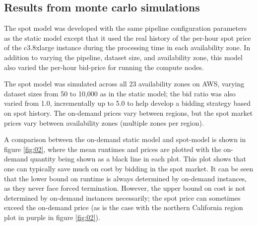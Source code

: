\documentclass{frontiersSCNS} %
\begin{document}
\subsection{Results from monte carlo simulations}

The spot model was developed with the same pipeline configuration parameters as the static model except that it used the real history of the per-hour spot price of the c3.8xlarge instance during the processing time in each availability zone. In addition to varying the pipeline, dataset size, and availability zone, this model also varied the per-hour bid-price for running the compute nodes.

The spot model was simulated across all 23 availability zones on AWS, varying dataset sizes from 50 to 10,000 as in the static model; the bid ratio was also varied from 1.0, incrementally up to 5.0 to help develop a bidding strategy based on spot history. The on-demand prices vary between regions, but the spot market prices vary between availability zones (multiple zones per region).

A comparison between the on-demand static model and spot-model is shown in figure \ref{fig:02}, where the mean runtimes and prices are plotted with the on-demand quantity being shown as a black line in each plot. This plot shows that one can typically save much on cost by bidding in the spot market. It can be seen that the lower bound on runtime is always determined by on-demand instances, as they never face forced termination. However, the upper bound on cost is not determined by on-demand instances necessarily; the spot price can sometimes exceed the on-demand price (as is the case with the northern California region plot in purple in figure \ref{fig:02}).
\end{document}
